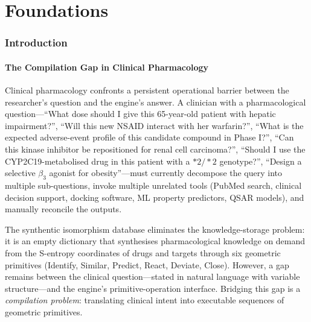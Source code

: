 \documentclass[11pt,twocolumn,a4paper]{article}
\theoremstyle{definition}
\theoremstyle{remark}
\begin{document}
\begin{abstract}
\medskip
\noindent\textbf{Keywords:} purpose injection, compiled probes, clinical query compilation, synthentic isomorphism, LoRA distillation, physics-supervised learning, teacher-student pharmacology, dose probe, toxicity probe, interaction probe, repositioning probe, personalisation probe, design probe, S-entropy conservation, pharmacological safety loss, zero-storage engine
\end{abstract}

\part{Foundations}

\section{Introduction}
\label{sec:introduction}

\subsection{The Compilation Gap in Clinical Pharmacology}

Clinical pharmacology confronts a persistent operational barrier between the researcher's question and the engine's answer. A clinician with a pharmacological question---``What dose should I give this 65-year-old patient with hepatic impairment?'', ``Will this new NSAID interact with her warfarin?'', ``What is the expected adverse-event profile of this candidate compound in Phase I?'', ``Can this kinase inhibitor be repositioned for renal cell carcinoma?'', ``Should I use the CYP2C19-metabolised drug in this patient with a $\ast 2/\ast 2$ genotype?'', ``Design a selective $\beta_3$ agonist for obesity''---must currently decompose the query into multiple sub-questions, invoke multiple unrelated tools (PubMed search, clinical decision support, docking software, ML property predictors, QSAR models), and manually reconcile the outputs.

The synthentic isomorphism database \citep{sachikonye2025e} eliminates the knowledge-storage problem: it is an empty dictionary that synthesises pharmacological knowledge on demand from the S-entropy coordinates of drugs and targets through six geometric primitives (Identify, Similar, Predict, React, Deviate, Close). However, a gap remains between the clinical question---stated in natural language with variable structure---and the engine's primitive-operation interface. Bridging this gap is a \emph{compilation problem}: translating clinical intent into executable sequences of geometric primitives.
\end{document}
